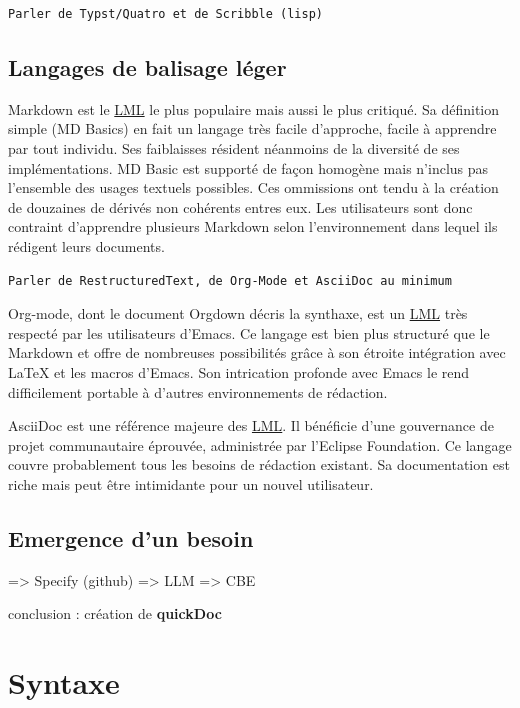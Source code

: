 \documentclass[a4paper,12pt]{article}
\begin{document}
\begin{verbatim}
Parler de Typst/Quatro et de Scribble (lisp)
\end{verbatim}
\subsection{Langages de balisage léger}
\label{sec:org39ff988}
Markdown est le \protect\hyperlink{gls-1}{\label{gls-1-use-2}LML} le plus populaire mais aussi le plus critiqué. Sa définition simple (MD Basics) en fait un langage très facile d'approche, facile à apprendre par tout individu. Ses faiblaisses résident néanmoins de la diversité de ses implémentations. MD Basic est supporté de façon homogène mais n'inclus pas l'ensemble des usages textuels possibles. Ces ommissions ont tendu à la création de douzaines de dérivés non cohérents entres eux. Les utilisateurs sont donc contraint d'apprendre plusieurs Markdown selon l'environnement dans lequel ils rédigent leurs documents.

\begin{verbatim}
Parler de RestructuredText, de Org-Mode et AsciiDoc au minimum
\end{verbatim}

Org-mode, dont le document Orgdown décris la synthaxe, est un \protect\hyperlink{gls-1}{\label{gls-1-use-3}LML} très respecté par les utilisateurs d'Emacs. Ce langage est bien plus structuré que le Markdown et offre de nombreuses possibilités grâce à son étroite intégration avec \LaTeX{} et les macros d'Emacs. Son intrication profonde avec Emacs le rend difficilement portable à d'autres environnements de rédaction.

AsciiDoc est une référence majeure des \protect\hyperlink{gls-1}{\label{gls-1-use-4}LML}. Il bénéficie d'une gouvernance de projet communautaire éprouvée, administrée par l'Eclipse Foundation. Ce langage couvre probablement tous les besoins de rédaction existant. Sa documentation est riche mais peut être intimidante pour un nouvel utilisateur.
\subsection{Emergence d'un besoin}
\label{sec:org5f9f0af}
=> Specify (github)
=> LLM
=> CBE

conclusion : création de \textbf{quickDoc}
\section{Syntaxe}
\label{sec:org273971a}
\end{document}

